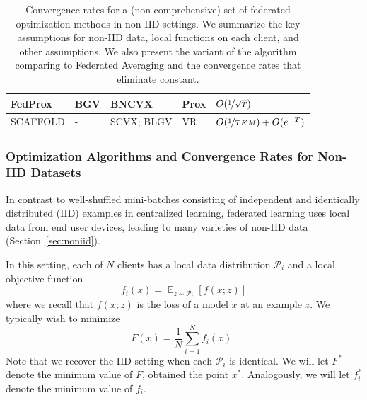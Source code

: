 \documentclass[11pt]{article}
\newcommand{\sketch}[1]{[{\color{darkgreen}{\emph{#1}}}]}
\DeclareMathOperator*{\E}{\mathbb{E}}
\begin{document}
\begin{table}
\begin{center}
\begin{tabularx}{\textwidth}{llllX}
FedProx \citep{li2018federated} & BGV & BNCVX & Prox &$O(\nicefrac{1}{\sqrt{T}})$\\
\hline
SCAFFOLD \citep{karimireddy2019scaffold} & - & SCVX; BLGV & VR & $O(\nicefrac{1}{TKM})+O(e^{-T})$
\\
\bottomrule
\end{tabularx}
\caption{Convergence rates for a (non-comprehensive) set of federated optimization methods in non-IID settings. We summarize the key assumptions for non-IID data, local functions on each client, and other assumptions. We also present the variant of the algorithm comparing to Federated Averaging and the convergence rates that eliminate constant.
}
\label{tab:non-iid-convergence}
\end{center}
\end{table}


\subsubsection{Optimization Algorithms and Convergence Rates for Non-IID Datasets}\label{sec:non-iid-algs}

In contrast to well-shuffled mini-batches consisting of independent and identically distributed (IID) examples in centralized learning, federated learning uses local data from end user devices, leading to many varieties of non-IID data (Section~\ref{sec:noniid}).

In this setting, each of $N$ clients has a local data distribution $\mathcal{P}_i$ and a local objective function
$$f_i(x) = \E_{z \sim \mathcal{P}_i}[ f(x ; z)]$$
where we recall that $f(x ; z)$ is the loss of a model $x$ at an example $z$. We typically wish to minimize
\begin{equation}
F(x) = \frac{1}{N}\sum_{i=1}^N f_i(x) \,.
\end{equation}
Note that we recover the IID setting when each $\mathcal{P}_i$ is identical. We will let $F^*$ denote the minimum value of $F$, obtained the point $x^*$. Analogously, we will let $f_i^*$ denote the minimum value of $f_i$.
\end{document}
